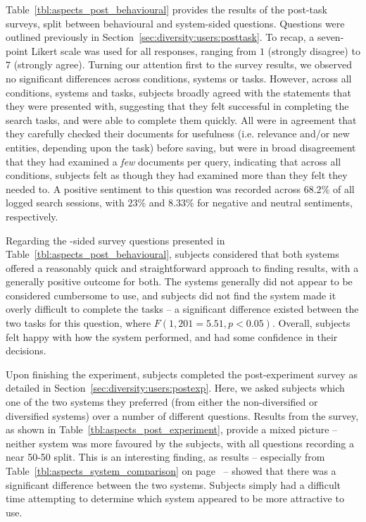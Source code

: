  Table~\ref{tbl:aspects_post_behavioural} provides the results of the post-task surveys, split between behavioural and system-sided questions. Questions were outlined previously in Section~\ref{sec:diversity:users:posttask}. To recap, a seven-point Likert scale was used for all responses, ranging from $1$ (strongly disagree) to $7$ (strongly agree). Turning our attention first to the  survey results, we observed no significant differences across conditions, systems or tasks. However, across all conditions, systems and tasks, subjects broadly agreed with the statements that they were presented with, suggesting that they felt successful in completing the search tasks, and were able to complete them quickly. All were in agreement that they carefully checked their documents for usefulness (i.e. relevance and/or new entities, depending upon the task) before saving, but were in broad disagreement that they had examined a \emph{few} documents per query, indicating that across all conditions, subjects felt as though they had examined more than they felt they needed to. A positive sentiment to this question was recorded across $68.2\%$ of all logged search sessions, with $23\%$ and $8.33\%$ for negative and neutral sentiments, respectively.

Regarding the -sided survey questions presented in Table~\ref{tbl:aspects_post_behavioural}, subjects considered that both systems offered a reasonably quick and straightforward approach to finding results, with a generally positive outcome for both. The systems generally did not appear to be considered cumbersome to use, and subjects did not find the system made it overly difficult to complete the tasks -- a significant difference existed between the two tasks for this question, where $F(1, 201=5.51, p<0.05)$. Overall, subjects felt happy with how the system performed, and had some confidence in their decisions.

Upon finishing the experiment, subjects completed the post-experiment survey as detailed in Section~\ref{sec:diversity:users:postexp}. Here, we asked subjects which one of the two systems they preferred (from either the non-diversified or diversified systems) over a number of different questions. Results from the survey, as shown in Table~\ref{tbl:aspects_post_experiment}, provide a mixed picture -- neither system was more favoured by the subjects, with all questions recording a near 50-50 split. This is an interesting finding, as results -- especially from Table~\ref{tbl:aspects_system_comparison} on page~\pageref{tbl:aspects_system_comparison} -- showed that there was a significant difference between the two systems. Subjects simply had a difficult time attempting to determine which system appeared to be more attractive to use.

